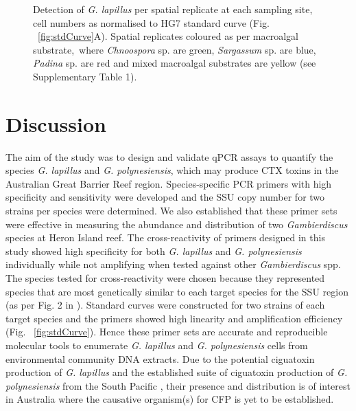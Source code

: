 \documentclass[12pt]{article}
\begin{document}
\FloatBarrier 
\begin{figure} 
\caption{Detection of \emph{G. lapillus} per spatial replicate at each sampling site, cell numbers as normalised to HG7 standard curve (Fig. ~\ref{fig:stdCurve}A). Spatial replicates coloured as per macroalgal substrate,\ where \emph{Chnoospora} sp. are green, \emph{Sargassum} sp. are blue, \emph{Padina} sp. are red and mixed macroalgal substrates are yellow (see Supplementary Table 1).} 
\label{fig:envHG7}
\end{figure} 
\FloatBarrier

\newpage
\section*{Discussion}
The aim of the study was to design and validate qPCR assays to quantify the species \emph{G. lapillus} and \emph{G. polynesiensis}, which may produce CTX toxins in the Australian Great Barrier Reef region. 
Species-specific PCR primers with high specificity and sensitivity were developed and the SSU copy number for two strains per species were determined. We also established that these primer sets were effective in measuring the abundance and distribution of two \emph{Gambierdiscus} species at Heron Island reef. The cross-reactivity of primers designed in this study showed high specificity for both \emph{G. lapillus} and \emph{G. polynesiensis} individually while not amplifying when tested against other \emph{Gambierdiscus} spp. The species tested for cross-reactivity were chosen because they represented species that are most genetically similar to each target species for the SSU region (as per Fig. 2 in \cite{kretzschmar2016characterization}).
Standard curves were constructed for two strains of each target species and the primers showed high linearity and amplification efficiency (Fig. ~\ref{fig:stdCurve}). Hence these primer sets are accurate and reproducible molecular tools to enumerate \emph{G. lapillus} and \emph{G. polynesiensis} cells from environmental community DNA extracts.
Due to the potential ciguatoxin production of \emph{G. lapillus} \cite{kretzschmar2016characterization} and the established suite of ciguatoxin production of \emph{G. polynesiensis} from the South Pacific \cite{chinain2010growth}, their presence and distribution is of interest in Australia where the causative organism(s) for CFP is yet to be established.\\
\end{document}
